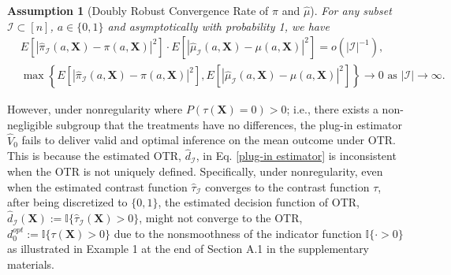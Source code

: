 \documentclass[11pt]{article}
\theoremstyle{referenceplain}
\newtheorem{Assumption}{Assumption}
\theoremstyle{referencedefinition}
\theoremstyle{referenceremark}
\begin{document}

\begin{Assumption}[Doubly Robust Convergence Rate of $\widehat{\pi}$ and $\widehat{\mu}$]\label{A7}
    For any subset $\mathcal{I}\subset[n]$, $a\in\{0,1\}$ and asymptotically with probability 1, we have 
\begin{align}
&E\left[\left|\widehat{\pi}_{\mathcal{I}}\left(a, \mathbf{X}\right)-\pi\left(a, \mathbf{X}\right)\right|^2\right]\cdot E\left[\left|\widehat{\mu}_{\mathcal{I}}\left(a, \mathbf{X}\right)-\mu\left(a, \mathbf{X}\right)\right|^2\right]=o(|\mathcal{I}|^{-1}),\label{DR-rate}\\
&\max\left\{E\left[\left|\widehat{\pi}_{\mathcal{I}}\left(a, \mathbf{X}\right)-\pi\left(a, \mathbf{X}\right)\right|^2\right], E\left[\left|\widehat{\mu}_{\mathcal{I}}\left(a, \mathbf{X}\right)-\mu\left(a, \mathbf{X}\right)\right|^2\right]\right\}\to 0 \text{ as $|\mathcal{I}|\to\infty$}.\label{super-consist}
\end{align}
\end{Assumption}
However, under nonregularity where $P(\tau(\mathbf{X})=0)>0$; i.e., there exists a non-negligible subgroup that the treatments have no differences, the plug-in estimator $\widehat{V}_0$ fails to deliver valid and optimal inference on the mean outcome under OTR. This is because the estimated OTR, $\widehat{d}_{\mathcal{I}}$, in Eq. \eqref{plug-in estimator} is inconsistent when the OTR is not uniquely defined. Specifically, under nonregularity, even when the estimated contrast function $\widehat{\tau}_{\mathcal{I}}$ converges to the contrast function $\tau$, after being discretized to $\{0,1\}$, the estimated decision function of OTR, $\widehat{d}_{\mathcal{I}}(\mathbf{X}):=\mathbb{I}\{\widehat{\tau}_{\mathcal{I}}(\mathbf{X})>0\}$, might not converge to the OTR, $d^{o p t}_0:=\mathbb{I}\{\tau(\mathbf{X})>0\}$ due to the nonsmoothness of the indicator function $\mathbb{I}\{\cdot > 0\}$ as illustrated in Example 1 at the end of Section A.1 in the supplementary materials. 
\end{document}
